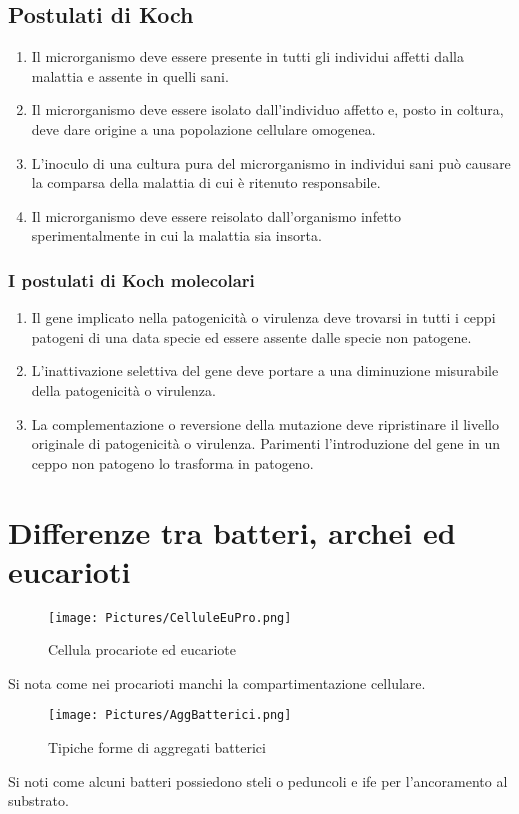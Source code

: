 \subsection{Postulati di Koch}
\begin{enumerate}
\item Il microrganismo deve essere presente in tutti gli individui affetti dalla malattia e assente in quelli sani.
\item Il microrganismo deve essere isolato dall'individuo affetto e, posto in coltura, deve dare origine a una popolazione cellulare omogenea.
\item L'inoculo di una cultura pura del microrganismo in individui sani pu\`o causare la comparsa della malattia di cui \`e ritenuto responsabile. 
\item Il microrganismo deve essere reisolato dall'organismo infetto sperimentalmente in cui la malattia sia insorta.
\end{enumerate}
\subsubsection{I postulati di Koch molecolari}
\begin{enumerate}
\item Il gene implicato nella patogenicit\`a o virulenza deve trovarsi in tutti i ceppi patogeni di una data specie ed essere assente dalle specie non 
patogene.
\item L'inattivazione selettiva del gene deve portare a una diminuzione misurabile della patogenicit\`a o virulenza.
\item La complementazione o reversione della mutazione deve ripristinare il livello originale di patogenicit\`a o virulenza. Parimenti l'introduzione del
gene in un ceppo non patogeno lo trasforma in patogeno.
\end{enumerate}
\section{Differenze tra batteri, archei ed eucarioti}
\begin{multicols}{2}
\begin{figure}[H]
\texttt{[image: Pictures/CelluleEuPro.png]}
\caption{Cellula procariote ed eucariote}
\end{figure}
Si nota come nei procarioti manchi la compartimentazione cellulare. 
\columnbreak
\begin{figure}[H]
\texttt{[image: Pictures/AggBatterici.png]}
\caption{Tipiche forme di aggregati batterici}
\end{figure}
Si noti come alcuni batteri possiedono steli o peduncoli e ife per l'ancoramento al substrato.
\end{multicols}
